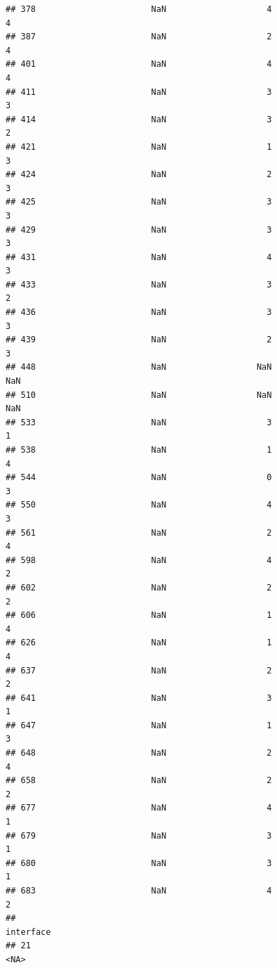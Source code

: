 \documentclass[
]{article}
\begin{document}
\begin{verbatim}
## 378                       NaN                    4                    4
## 387                       NaN                    2                    4
## 401                       NaN                    4                    4
## 411                       NaN                    3                    3
## 414                       NaN                    3                    2
## 421                       NaN                    1                    3
## 424                       NaN                    2                    3
## 425                       NaN                    3                    3
## 429                       NaN                    3                    3
## 431                       NaN                    4                    3
## 433                       NaN                    3                    2
## 436                       NaN                    3                    3
## 439                       NaN                    2                    3
## 448                       NaN                  NaN                  NaN
## 510                       NaN                  NaN                  NaN
## 533                       NaN                    3                    1
## 538                       NaN                    1                    4
## 544                       NaN                    0                    3
## 550                       NaN                    4                    3
## 561                       NaN                    2                    4
## 598                       NaN                    4                    2
## 602                       NaN                    2                    2
## 606                       NaN                    1                    4
## 626                       NaN                    1                    4
## 637                       NaN                    2                    2
## 641                       NaN                    3                    1
## 647                       NaN                    1                    3
## 648                       NaN                    2                    4
## 658                       NaN                    2                    2
## 677                       NaN                    4                    1
## 679                       NaN                    3                    1
## 680                       NaN                    3                    1
## 683                       NaN                    4                    2
##                                                              interface
## 21                                                                <NA>

\end{verbatim}
\end{document}
